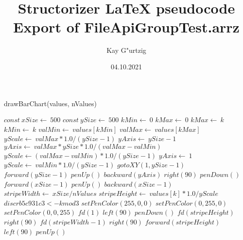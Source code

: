 \documentclass[a4paper,10pt]{article}
\title{Structorizer LaTeX pseudocode Export of FileApiGroupTest.arrz}
\author{Kay G"urtzig}
\date{04.10.2021}
\begin{document}
\begin{algorithm}
\caption{drawBarChart(values, nValues)}
\begin{algorithmic}[5]

\STATE {}
\STATE {}
\STATE {}
\STATE {}
  \STATE \(const\ xSize\gets\ 500\)
  \STATE \(const\ ySize\gets\ 500\)
  \STATE \(kMin\gets\ 0\)
  \STATE \(kMax\gets\ 0\)
      \STATE \(kMax\gets\ k\)
    \ELSE
        \STATE \(kMin\gets\ k\)
      \ENDIF
    \ENDIF
  \ENDFOR
  \STATE \(valMin\gets\ values[kMin]\)
  \STATE \(valMax\gets\ values[kMax]\)
  \STATE \(yScale\gets\ valMax*1.0/(ySize-1)\)
  \STATE \(yAxis\gets\ ySize-1\)
      \STATE \(yAxis\gets\ valMax*ySize*1.0/(valMax-valMin)\)
      \STATE \(yScale\gets(valMax-valMin)*1.0/(ySize-1)\)
    \ELSE
      \STATE \(yAxis\gets\ 1\)
      \STATE \(yScale\gets\ valMin*1.0/(ySize-1)\)
    \ENDIF
  \ENDIF
  \STATE \(gotoXY(1,ySize-1)\)
  \STATE \(forward(ySize-1)\)
  \STATE \(penUp()\)
  \STATE \(backward(yAxis)\)
  \STATE \(right(90)\)
  \STATE \(penDown()\)
  \STATE \(forward(xSize-1)\)
  \STATE \(penUp()\)
  \STATE \(backward(xSize-1)\)
  \STATE \(stripeWidth\gets\ xSize/nValues\)
    \STATE \(stripeHeight\gets\ values[k]*1.0/yScale\)
    \STATE \(discrb5c931c3 <- k mod 3\)
      \STATE \(setPenColor(255,0,0)\)
      \STATE \(setPenColor(0,255,0)\)
      \STATE \(setPenColor(0,0,255)\)
    \ENDIF
    \STATE \(fd(1)\)
    \STATE \(left(90)\)
    \STATE \(penDown()\)
    \STATE \(fd(stripeHeight)\)
    \STATE \(right(90)\)
    \STATE \(fd(stripeWidth-1)\)
    \STATE \(right(90)\)
    \STATE \(forward(stripeHeight)\)
    \STATE \(left(90)\)
    \STATE \(penUp()\)
  \ENDFOR

\end{algorithmic}
\end{algorithm}
\end{document}
